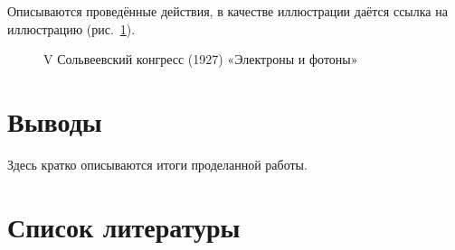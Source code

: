 \documentclass[
  12pt,
  a4paper,
  DIV=11,
  numbers=noendperiod]{scrreprt}
\begin{document}
Описываются проведённые действия, в качестве иллюстрации даётся ссылка
на иллюстрацию (рис.~\ref{fig-001}).

\begin{figure}


\caption{\label{fig-001}V Сольвеевский конгресс (1927) «Электроны и
фотоны»}

\end{figure}%

\chapter{Выводы}\label{ux432ux44bux432ux43eux434ux44b}

Здесь кратко описываются итоги проделанной работы.

\chapter*{Список
литературы}\label{ux441ux43fux438ux441ux43eux43a-ux43bux438ux442ux435ux440ux430ux442ux443ux440ux44b}

\printbibliography[heading=none]
\end{document}
